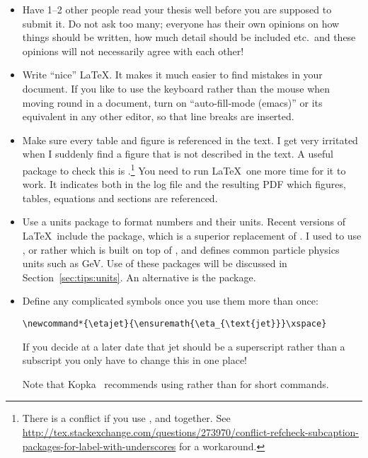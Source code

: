 \begin{itemize}
\item Have 1--2 other people read your thesis well before you are
  supposed to submit it. Do not ask too many; everyone has their own
  opinions on how things should be written, how much detail should be
  included etc.\ and these opinions will not necessarily agree with
  each other!

\item Write \enquote{nice} \LaTeX. It makes it much easier to find mistakes
  in your document. If you like to use the keyboard rather than the
  mouse when moving round in a document, turn on \enquote{auto-fill-mode
  (emacs)} or its equivalent in any other editor, so
  that line breaks are inserted.

\item Make sure every table and figure is referenced in the text. I
  get very irritated when I suddenly find a figure that is not
  described in the text. A useful package to check this is
  .\footnote{%
  There is a conflict if you use ,  and  together.
  See \url{http://tex.stackexchange.com/questions/273970/conflict-refcheck-subcaption-packages-for-label-with-underscores} for a workaround.}
  You need to run \LaTeX\ one more time for it to
  work. It indicates both in the log file and the resulting PDF which
  figures, tables, equations and sections are referenced.

\item Use a units package to format numbers and their units. Recent
  versions of \LaTeX\ include the  package, which
  is a superior replacement of . I used to
  use , or rather  which is
  built on top of , and defines common particle
  physics units such as \si{\GeV}. Use of these packages will be
  discussed in Section~\ref{sec:tips:units}. An alternative is the
   package.

\item Define any complicated symbols once you use them more than
  once:
\begin{verbatim}
\newcommand*{\etajet}{\ensuremath{\eta_{\text{jet}}}\xspace}
\end{verbatim}
  If you decide at a later date that jet should be a superscript
  rather than a subscript you only have to change this in one place!

  Note that Kopka~\cite{kopka04}
  recommends using  rather than 
  for short commands.


\end{itemize}
